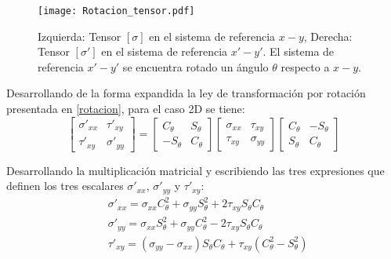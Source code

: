 \documentclass[../notas medios.tex]{subfiles}
\begin{document}
\begin{figure}[H]
\centering
\texttt{[image: Rotacion\_tensor.pdf]}
\caption{Izquierda: Tensor $[\sigma]$ en el sistema de referencia $x-y$, Derecha: Tensor $[\sigma ']$ en el sistema de referencia $x'-y'$. El sistema de referencia $x'-y'$ se encuentra rotado un ángulo $\theta$ respecto a $x-y$.} 
\label{rota2D}
\end{figure} 
%
Desarrollando de la forma expandida la  ley de transformación por rotación presentada en \cref{rotacion}, para el caso 2D se tiene: \\
%
\begin{equation}
\left[ 
\begin{array}{ccc}
\sigma '_{xx} & \tau '_{xy} \\
\tau '_{xy} & \sigma '_{yy}
\end{array}
\right] =
\left[ 
\begin{array}{ccc}
C_\theta & S_\theta \\
-S_\theta & C_\theta
\end{array}
\right]
\left[ 
\begin{array}{ccc}
\sigma_{xx} & \tau_{xy} \\
\tau_{xy} & \sigma_{yy}
\end{array}
\right]
\left[ 
\begin{array}{ccc}
C_\theta & -S_\theta \\
S_\theta & C_\theta
\end{array}
\right]
\label{trans2d}
\end{equation}

Desarrollando la multiplicación matricial y escribiendo las tres expresiones 
que definen los tres escalares $\sigma'_{xx}$, $\sigma'_{yy}$ y $\tau'_{xy}$:\\

\begin{equation}
\begin{aligned}
&\sigma ' _{xx} = \sigma _{xx} C^2 _\theta + \sigma _{yy} S^2 _\theta + 2 \tau _{xy} S _\theta C _\theta \\
&\sigma ' _{yy} = \sigma _{xx} S^2 _\theta + \sigma _{yy} C^2 _\theta - 2 \tau _{xy} S _\theta C _\theta \\
&\tau ' _{xy} = (\sigma _{yy} - \sigma _{xx}) S_\theta C _\theta +  \tau _{xy} (C^2 _\theta - S^2 _\theta) \\
\end{aligned}
\label{trans}
\end{equation}
%
\end{document}
